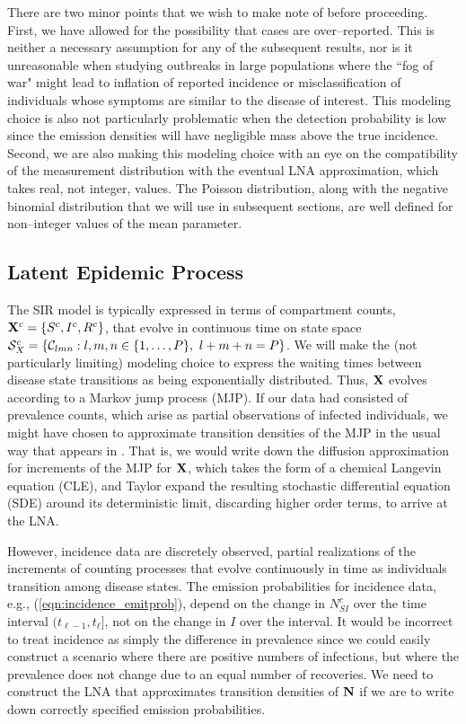 There are two minor points that we wish to make note of before proceeding. First, we have allowed for the possibility that cases are over--reported. This is neither a necessary assumption for any of the subsequent results, nor is it unreasonable when studying outbreaks in large populations where the ``fog of war" might lead to inflation of reported incidence or misclassification of individuals whose symptoms are similar to the disease of interest. This modeling choice is also not particularly problematic when the detection probability is low since the emission densities will have negligible mass above the true incidence. Second, we are also making this modeling choice with an eye on the compatibility of the measurement distribution with the eventual LNA approximation, which takes real, not integer, values. The Poisson distribution, along with the negative binomial distribution that we will use in subsequent sections, are well defined for non--integer values of the mean parameter. 

\subsection{Latent Epidemic Process}
\label{subsec:lna_epid_proc}

The SIR model is typically expressed in terms of compartment counts, $ \mathbf{X}^c = \lbrace S^c,I^c,R^c\rbrace $, that evolve in continuous time on state space $ \mathcal{S}_X^c = \left \lbrace \mathcal{C}_{lmn}:l,m,n\in\lbrace1,\dots,P\rbrace,\ l+m+n=P\right \rbrace $. We will make the (not particularly limiting) modeling choice to express the waiting times between disease state transitions as being exponentially distributed. Thus, $ \mathbf{X} $ evolves according to a Markov jump process (MJP). If our data had consisted of prevalence counts, which arise as partial observations of infected individuals, we might have chosen to approximate transition densities of the MJP in the usual way that appears in \cite{komorowski2009,fearnhead2014}. That is, we would write down the diffusion approximation for increments of the MJP for $ \mathbf{X} $, which takes the form of a chemical Langevin equation (CLE), and Taylor expand the resulting stochastic differential equation (SDE) around its deterministic limit, discarding higher order terms, to arrive at the LNA. 

However, incidence data are discretely observed, partial realizations of the increments of counting processes that evolve continuously in time as individuals transition among disease states. The emission probabilities for incidence data, e.g., (\ref{eqn:incidence_emitprob}), depend on the change in $ N_{SI}^c $ over the time interval $ (t_{\ell-1},t_\ell] $, not on the change in $ I $ over the interval. It would be incorrect to treat incidence as simply the difference in prevalence since we could easily construct a scenario where there are positive numbers of infections, but where the prevalence does not change due to an equal number of recoveries. We need to construct the LNA that approximates transition densities of $ \mathbf{N} $ if we are to write down correctly specified emission probabilities.

